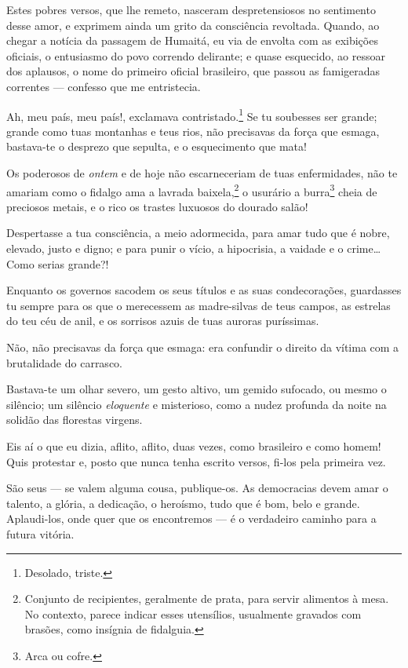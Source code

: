 Estes pobres versos, que lhe remeto, nasceram despretensiosos no
sentimento desse amor, e exprimem ainda um grito da consciência
revoltada. Quando, ao chegar a notícia da passagem de Humaitá, eu via de
envolta com as exibições oficiais, o entusiasmo do povo correndo
delirante; e quase esquecido, ao ressoar dos aplausos, o nome do
primeiro oficial brasileiro, que passou as famigeradas correntes ---
confesso que me entristecia.

Ah, meu país, meu país!, exclamava contristado.\footnote{Desolado,
  triste.} Se tu soubesses ser grande; grande como tuas montanhas e
teus rios, não precisavas da força que esmaga, bastava-te o desprezo que
sepulta, e o esquecimento que mata!

Os poderosos de \emph{ontem} e de hoje não escarneceriam de tuas
enfermidades, não te amariam como o fidalgo ama a lavrada
baixela,\footnote{Conjunto de recipientes, geralmente de prata, para
  servir alimentos à mesa. No contexto, parece indicar esses utensílios,
  usualmente gravados com brasões, como insígnia de fidalguia.} o
usurário a burra\footnote{Arca ou cofre.} cheia de preciosos metais, e
o rico os trastes luxuosos do dourado salão!

Despertasse a tua consciência, a meio adormecida, para amar tudo que é
nobre, elevado, justo e digno; e para punir o vício, a hipocrisia, a
vaidade e o crime\ldots{} Como serias grande?!

Enquanto os governos sacodem os seus títulos e as suas condecorações,
guardasses tu sempre para os que o merecessem as madre-silvas de teus
campos, as estrelas do teu céu de anil, e os sorrisos azuis de tuas
auroras puríssimas.

Não, não precisavas da força que esmaga: era confundir o direito da
vítima com a brutalidade do carrasco.

Bastava-te um olhar severo, um gesto altivo, um gemido sufocado, ou
mesmo o silêncio; um silêncio \emph{eloquente} e misterioso, como a
nudez profunda da noite na solidão das florestas virgens.

Eis aí o que eu dizia, aflito, aflito, duas vezes, como brasileiro e
como homem! Quis protestar e, posto que nunca tenha escrito versos,
fi-los pela primeira vez.

São seus --- se valem alguma cousa, publique-os. As democracias devem
amar o talento, a glória, a dedicação, o heroísmo, tudo que é bom, belo
e grande. Aplaudi-los, onde quer que os encontremos --- é o verdadeiro
caminho para a futura vitória.

